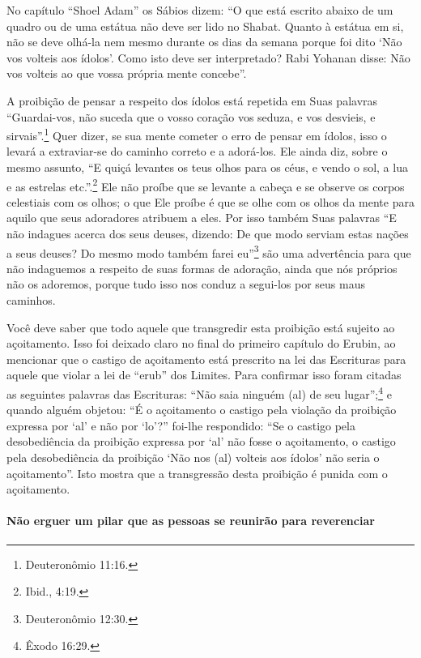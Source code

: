 No capítulo ``Shoel Adam'' os Sábios dizem: ``O que está escrito abaixo
de um quadro ou de uma estátua não deve ser lido no Shabat. Quanto à
estátua em si, não se deve olhá-la nem mesmo durante os dias da semana
porque foi dito `Não vos volteis aos ídolos'. Como isto deve ser
interpretado? Rabi Yohanan disse: Não vos volteis ao que vossa própria
mente concebe''.

A proibição de pensar a respeito dos ídolos está repetida em Suas
palavras ``Guardai-vos, não suceda que o vosso coração vos seduza, e vos
desvieis, e sirvais''.\footnote{Deuteronômio 11:16.} Quer dizer, se sua mente
cometer o erro de pensar em ídolos, isso o levará a extraviar-se do
caminho correto e a adorá-los. Ele ainda diz, sobre o mesmo assunto, ``E
quiçá levantes os teus olhos para os céus, e vendo o sol, a lua e as
estrelas etc.''.\footnote{Ibid., 4:19.} Ele não proíbe que se levante a cabeça e
se observe os corpos celestiais com os olhos; o que Ele proíbe é que se
olhe com os olhos da mente para aquilo que seus adoradores atribuem a
eles. Por isso também Suas palavras ``E não indagues acerca dos seus
deuses, dizendo: De que modo serviam estas nações a seus deuses? Do
mesmo modo também farei eu''\footnote{Deuteronômio 12:30.} são uma advertência
para que não indaguemos a respeito de suas formas de adoração, ainda que
nós próprios não os adoremos, porque tudo isso nos conduz a segui-los
por seus maus caminhos.

Você deve saber que todo aquele que transgredir esta proibição está
sujeito ao açoitamento. Isso foi deixado claro no final do primeiro
capítulo do Erubin, ao mencionar que o castigo de açoitamento está
prescrito na lei das Escrituras para aquele que violar a lei de ``erub''
dos Limites. Para confirmar isso foram citadas as seguintes palavras das
Escrituras: ``Não saia ninguém (al) de seu lugar'';\footnote{Êxodo 16:29.} e
quando alguém objetou: ``É o açoitamento o castigo pela violação da
proibição expressa por `al' e não por `lo'?'' foi-lhe respondido: ``Se o
castigo pela desobediência da proibição expressa por `al' não fosse o
açoitamento, o castigo pela desobediência da proibição `Não nos (al)
volteis aos ídolos' não seria o açoitamento''. Isto mostra que a
transgressão desta proibição é punida com o açoitamento.

\paragraph{Não erguer um pilar que as pessoas se reunirão para reverenciar}

